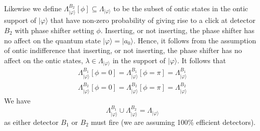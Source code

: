 \documentclass[12pt]{article}
\begin{document}
Likewise we define $\Lambda_{|\varphi\rangle}^{B_2}[\phi] \subseteq \Lambda_{|\varphi\rangle}$ to be the subset of ontic states in the ontic support of $|\varphi\rangle$ that have non-zero
probability of giving rise to a click at detector $B_2$ with phase shifter setting $\phi$.  Inserting, or not inserting, the phase shifter has no affect on the quantum state
$|\varphi\rangle=|a_0\rangle$.  Hence, it follows from the assumption of ontic indifference that inserting, or not inserting, the phase shifter has no affect on the ontic states, $\lambda\in
\Lambda_{|\varphi\rangle}$ in the support of $|\varphi\rangle$.
It follows that
\begin{eqnarray} \Lambda_{|\varphi\rangle}^{B_1}[\phi=0] =\Lambda_{|\varphi\rangle}^{B_1}[\phi=\pi] =
\Lambda_{|\varphi\rangle}^{B_1}\\ \Lambda_{|\varphi\rangle}^{B_2}[\phi=0] =\Lambda_{|\varphi\rangle}^{B_2}[\phi=\pi] = \Lambda_{|\varphi\rangle}^{B_2}            \label{onticindifB2}
\end{eqnarray} We have \begin{equation} \label{B1cupB2} \Lambda_{|\varphi\rangle}^{B_1} \cup \Lambda_{|\varphi\rangle}^{B_2} = \Lambda_{|\varphi\rangle} \end{equation}
as either detector $B_1$ or $B_2$ must fire (we are assuming 100\% efficient detectors).
\end{document}
